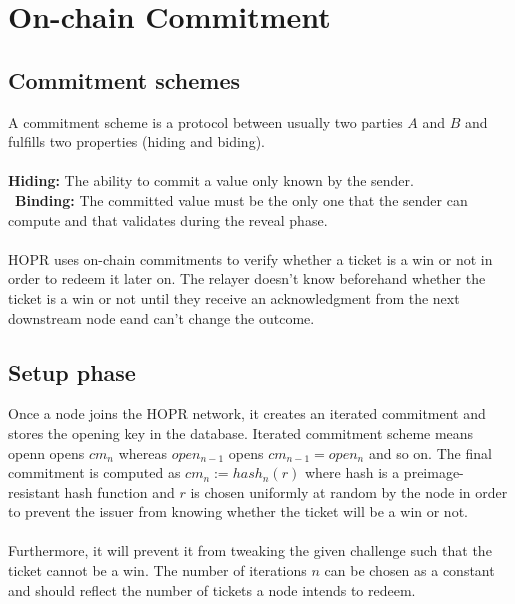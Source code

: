 \section{On-chain Commitment}

\subsection*{Commitment schemes}
A commitment scheme is a protocol between usually two parties $A$ and $B$ and fulfills two properties (hiding and biding).
\\~\\\textbf{Hiding:} The ability to commit a value only known by the sender.
\\~\textbf{Binding:} The committed value must be the only one that the sender can compute and that validates during the reveal phase. 
\\~\\HOPR uses on-chain commitments to verify whether a ticket is a win or not in order to redeem it later on. The relayer doesn't know beforehand whether the ticket is a win or not until they receive an acknowledgment from the next downstream node eand can't change the outcome.
\subsection{Setup phase}
Once a node joins the HOPR network, it creates an iterated commitment and stores the opening key in the database. 
Iterated commitment scheme means openn opens $cm_n$ whereas $open_{n-1}$ opens $cm_{n-1}=open_n$ and so on. 
\newline The final commitment is computed as $cm_n:= hash_n(r)$ where hash is a preimage-resistant hash function and 
$r$ is chosen uniformly at random by the node in order to prevent the issuer from knowing whether the ticket will be a win or not. 
\\~\\ Furthermore, it will prevent it from tweaking the given challenge such that the ticket cannot be a win.
The number of iterations $n$ can be chosen as a constant and should reflect the number of tickets a node intends to redeem.

